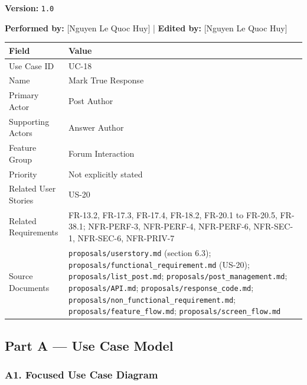 \documentclass[12pt]{article}
\renewcommand{\baselinestretch}{1.5}
\begin{document}
\textbf{Version:} \texttt{1.0}
\par\medskip

\textbf{Performed by:} [Nguyen Le Quoc Huy] | \textbf{Edited by:} [Nguyen Le Quoc Huy]
\par\medskip

\begingroup
\small
\renewcommand{\baselinestretch}{1.0}\selectfont
\renewcommand{\arraystretch}{1.15}
\setlength{\tabcolsep}{6pt}
\begin{longtable}{|>{\raggedright\arraybackslash}p{}|>{\raggedright\arraybackslash}p{}|}
\hline
\textbf{Field} & \textbf{Value} \\ \hline
\endhead
Use Case ID & UC-18 \\ \hline
Name & Mark True Response \\ \hline
Primary Actor & Post Author \\ \hline
Supporting Actors & Answer Author \\ \hline
Feature Group & Forum Interaction \\ \hline
Priority & Not explicitly stated \\ \hline
Related User Stories & US-20 \\ \hline
Related Requirements & FR-13.2, FR-17.3, FR-17.4, FR-18.2, FR-20.1 to FR-20.5, FR-38.1; NFR-PERF-3, NFR-PERF-4, NFR-PERF-6, NFR-SEC-1, NFR-SEC-6, NFR-PRIV-7 \\ \hline
Source Documents & \texttt{proposals/userstory.md} (section 6.3); \texttt{proposals/functional\_requirement.md} (US-20); \texttt{proposals/list\_post.md}; \texttt{proposals/post\_management.md}; \texttt{proposals/API.md}; \texttt{proposals/response\_code.md}; \texttt{proposals/non\_functional\_requirement.md}; \texttt{proposals/feature\_flow.md}; \texttt{proposals/screen\_flow.md} \\ \hline
\end{longtable}
\endgroup
\par\medskip

\hypertarget{sec:part-a-use-case-model}{}
\subsection*{Part A --- Use Case Model}
\par\medskip

\hypertarget{sec:a1-focused-use-case-diagram}{}
\subsubsection*{A1. Focused Use Case Diagram}
\par\medskip
\end{document}
